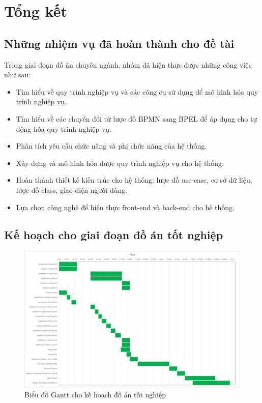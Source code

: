 \section{Tổng kết}
\subsection{Những nhiệm vụ đã hoàn thành cho đề tài}
Trong giai đoạn đồ án chuyên ngành, nhóm đã hiện thực được những công việc như sau:
\begin{itemize}
    \item Tìm hiểu về quy trình nghiệp vụ và các công cụ sử dụng để mô hình hóa quy trình nghiệp vụ.
    \item Tìm hiểu về các chuyển đổi từ lược đồ BPMN sang BPEL để áp dụng cho tự động hóa quy trình nghiệp vụ.
    \item Phân tích yêu cầu chức năng và phi chức năng của hệ thống.
    \item Xây dựng và mô hình hóa được quy trình nghiệp vụ cho hệ thống.
    \item Hoàn thành thiết kế kiến trúc cho hệ thống: lược đồ use-case, cơ sở dữ liệu, lược đồ class, giao diện người dùng.
    \item  Lựa chọn công nghệ để hiện thực front-end và back-end cho hệ thống.
\end{itemize}
 
 
\subsection{Kế hoạch cho giai đoạn đồ án tốt nghiệp}
 
\begin{figure}[h]
    \begin{center}
        \includegraphics[width=14cm]{img/plan.png}
    \end{center}
    \caption{Biểu đồ Gantt cho kế hoạch đồ án tốt nghiệp}
\end{figure}
 
